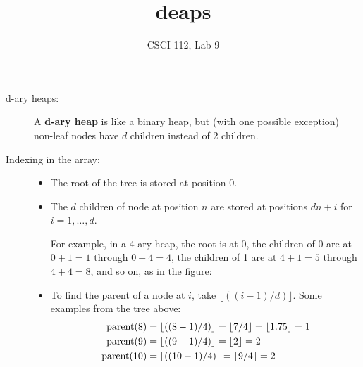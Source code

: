 \documentclass{article}
\title{deaps}
\author{CSCI 112, Lab 9}
\date{}
\newcommand{\id}[1]{\makebox{#1}}
\begin{document}
\sloppy

\maketitle


\begin{description}
\item[d-ary heaps:]

 A \textbf{d-ary heap} is like a binary heap, but (with one possible
 exception) non-leaf nodes have $d$ children instead of 2 children.
\item[Indexing in the array:]

   \begin{itemize}
     \item
       The root of the tree is stored at position 0.
     \item 
       The $d$ children of node at position $n$ are stored at positions
       $dn + i$ for $i= 1,\ldots, d$.

       For example, in a 4-ary heap, the root is at 0, the children of
       0 are at $0+1 = 1$ through $0+4=4$, the children of 1 are
       at $4+1=5$ through $4+4=8$, and so on, as in the
       figure:


\item To find the parent of a node at $i$, take
  $\lfloor((i-1)/d)\rfloor$.  Some examples from the tree above:
  \begin{align*}
    \id{parent}(8) &=   \lfloor((8-1)/4)\rfloor =
     \lfloor 7/4 \rfloor =     \lfloor 1.75\rfloor =
    1\\
\id{parent}(9) &=   \lfloor((9-1)/4)\rfloor = \lfloor 2\rfloor = 2\\
\id{parent}(10) &=   \lfloor((10-1)/4)\rfloor = \lfloor 9/4 \rfloor = 2
  \end{align*}


\end{itemize}
\end{description}
\end{document}
